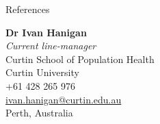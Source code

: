 \begin{rSection}{References}
\begin{multicols}{2}
{\textbf{Dr Ivan Hanigan}}\\
{\textit{Current line-manager}}\\
{Curtin School of Population Health}\\
{Curtin University}\\
{+61 428 265 976}\\
\href{mailto:ivan.hanigan@curtin.edu.au}{ivan.hanigan@curtin.edu.au}\\
{Perth, Australia}\par

\end{multicols}

\end{rSection}
